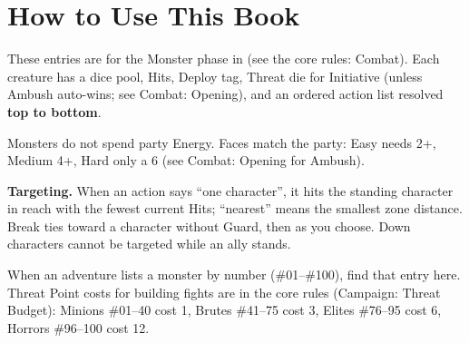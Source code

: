 \documentclass[10pt,a4paper,titlepage,onecolumn]{scrartcl}
\begin{document}


\tableofcontents

\clearpage

\section{How to Use This Book}

These entries are for the Monster phase in \game{} (see the core rules: Combat).
Each creature has a dice pool, Hits, Deploy tag, Threat die for Initiative (unless Ambush auto-wins; see Combat: Opening), and an ordered action list resolved \textbf{top to bottom}.

Monsters do not spend party Energy. Faces match the party: Easy needs 2+, Medium 4+, Hard only a 6 (see Combat: Opening for Ambush).

\textbf{Targeting.} When an action says ``one character'', it hits the standing character in reach with the fewest current Hits; ``nearest'' means the smallest zone distance. Break ties toward a character without Guard, then as you choose. Down characters cannot be targeted while an ally stands.

When an adventure lists a monster by number (\#01--\#100), find that entry here. Threat Point costs for building fights are in the core rules (Campaign: Threat Budget): Minions \#01--40 cost 1, Brutes \#41--75 cost 3, Elites \#76--95 cost 6, Horrors \#96--100 cost 12.



\clearpage
\printindex
\end{document}
